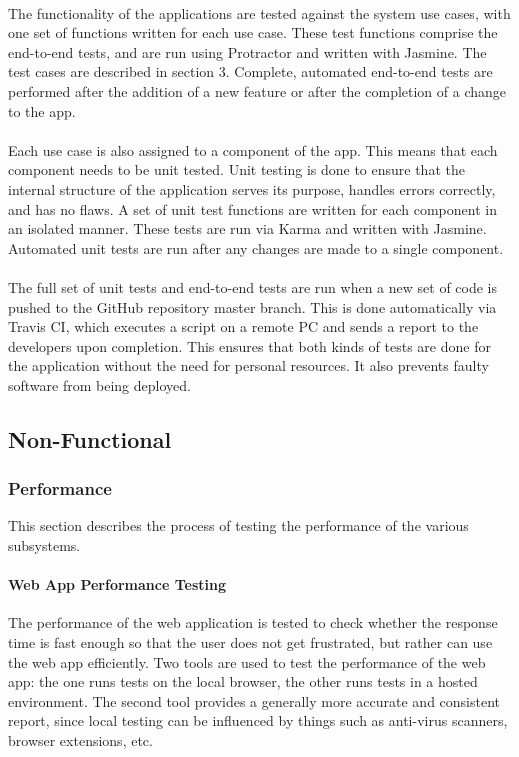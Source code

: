 \documentclass[a4paper, 11pt]{article}
\begin{document}
        \paragraph{}
        The functionality of the applications are tested against the system use cases, with one set of functions written for each use case. These test functions comprise the end-to-end tests, and are run using Protractor and written with Jasmine. The test cases are described in section 3. Complete, automated end-to-end tests are performed after the addition of a new feature or after the completion of a change to the app.
        \paragraph{}
        Each use case is also assigned to a component of the app. This means that each component needs to be unit tested. Unit testing is done to ensure that the internal structure of the application serves its purpose, handles errors correctly, and has no flaws. A set of unit test functions are written for each component in an isolated manner. These tests are run via Karma and written with Jasmine. Automated unit tests are run after any changes are made to a single component.
        \paragraph{}
        The full set of unit tests and end-to-end tests are run when a new set of code is pushed to the GitHub repository master branch. This is done automatically via Travis CI, which executes a script on a remote PC and sends a report to the developers upon completion. This ensures that both kinds of tests are done for the application without the need for personal resources. It also prevents faulty software from being deployed.
    
    \subsection{Non-Functional}
        \subsubsection{Performance}
        This section describes the process of testing the performance of the various subsystems.
        
            \paragraph{Web App Performance Testing}
            The performance of the web application is tested to check whether the response time is fast enough so that the user does not get frustrated, but rather can use the web app efficiently. Two tools are used to test the performance of the web app: the one runs tests on the local browser, the other runs tests in a hosted environment. The second tool provides a generally more accurate and consistent report, since local testing can be influenced by things such as anti-virus scanners, browser extensions, etc.
\end{document}
